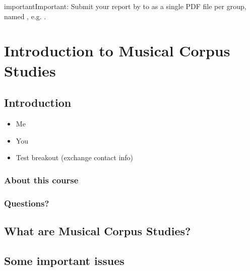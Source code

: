\documentclass[letterpaper,10pt,english]{sphinxmanual}
\begin{document}
\begin{sphinxadmonition}{important}{Important:}
Submit your report by  to 
as a single PDF file per group, named , e.g. .
\end{sphinxadmonition}


\chapter{Introduction to Musical Corpus Studies}
\label{\detokenize{01_intro_background:Introduction-to-Musical-Corpus-Studies}}\label{\detokenize{01_intro_background::doc}}

\section{Introduction}
\label{\detokenize{01_intro_background:Introduction}}\begin{itemize}
\item {} 
Me

\item {} 
You

\item {} 
Test breakout (exchange contact info)

\end{itemize}


\subsection{About this course}
\label{\detokenize{01_intro_background:About-this-course}}

\subsection{Questions?}
\label{\detokenize{01_intro_background:Questions?}}

\section{What are Musical Corpus Studies?}
\label{\detokenize{01_intro_background:What-are-Musical-Corpus-Studies?}}

\section{Some important issues}
\label{\detokenize{01_intro_background:Some-important-issues}}
\end{document}
